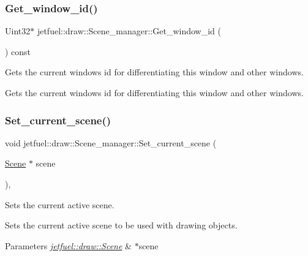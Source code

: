 \subsubsection{\texorpdfstring{Get\+\_\+window\+\_\+id()}{Get\_window\_id()}}
{\footnotesize\ttfamily Uint32$\ast$ jetfuel\+::draw\+::\+Scene\+\_\+manager\+::\+Get\+\_\+window\+\_\+id (\begin{DoxyParamCaption}{ }\end{DoxyParamCaption}) const\hspace{0.3cm}{\ttfamily [inline]}}



Gets the current window\textquotesingle{}s id for differentiating this window and other windows. 

Gets the current window\textquotesingle{}s id for differentiating this window and other windows. \mbox{\label{classjetfuel_1_1draw_1_1Scene__manager_a3c2b083844adc254edfba9278222dac8}} 
\subsubsection{\texorpdfstring{Set\+\_\+current\+\_\+scene()}{Set\_current\_scene()}}
{\footnotesize\ttfamily void jetfuel\+::draw\+::\+Scene\+\_\+manager\+::\+Set\+\_\+current\+\_\+scene (\begin{DoxyParamCaption}\item[{\hyperlink{classjetfuel_1_1draw_1_1Scene}{Scene} $\ast$}]{scene }\end{DoxyParamCaption})\hspace{0.3cm}{\ttfamily [inline]}, {\ttfamily [protected]}}



Sets the current active scene. 

Sets the current active scene to be used with drawing objects.


\begin{DoxyParams}{Parameters}
{\em \hyperlink{classjetfuel_1_1draw_1_1Scene}{jetfuel\+::draw\+::\+Scene}} & $\ast$scene \\
\hline
\end{DoxyParams}
\mbox{\label{classjetfuel_1_1draw_1_1Scene__manager_ac74ac2f84b41a181fe1c3814ee9a602f}} 
